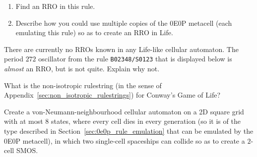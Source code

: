 \begin{multicols}{2}
\begin{problem}
		\begin{enumerate}[label=\bf\color{ocre}(\alph*)]
			\item {} Find an RRO in this rule.
			
			\item {} Describe how you could use multiple copies of the 0E0P metacell (each emulating this rule) so as to create an RRO in Life.
			
		\end{enumerate}
	\end{problem}


	\mfilbreak
	
	
	\begin{problemstar}\label{exer:life_like_almost_rro} 
		There are currently no RROs known in any Life-like cellular automaton. The period $272$ oscillator from the rule \texttt{B02348/S0123} that is displayed below is \emph{almost} an RRO, but is not quite. Explain why not.
		
		\begin{center}
		\end{center}
	\end{problemstar}


	\mfilbreak
	
	
	\begin{problemstar}\label{exer:non_isotropic_rulestring_life} 
		What is the non-isotropic rulestring (in the sense of Appendix~\ref{sec:non_isotropic_rulestrings}) for Conway's Game of Life?
	\end{problemstar}


	\mfilbreak


	\begin{problem}\label{exer:0e0p_one_cell_smos} 
		Create a von-Neumann-neighbourhood cellular automaton on a 2D square grid with at most $8$ states, where every cell dies in every generation (so it is of the type described in Section~\ref{sec:0e0p_rule_emulation} that can be emulated by the 0E0P metacell), in which two single-cell spaceships can collide so as to create a $2$-cell SMOS.
		
	\end{problem}
	

\end{multicols}
